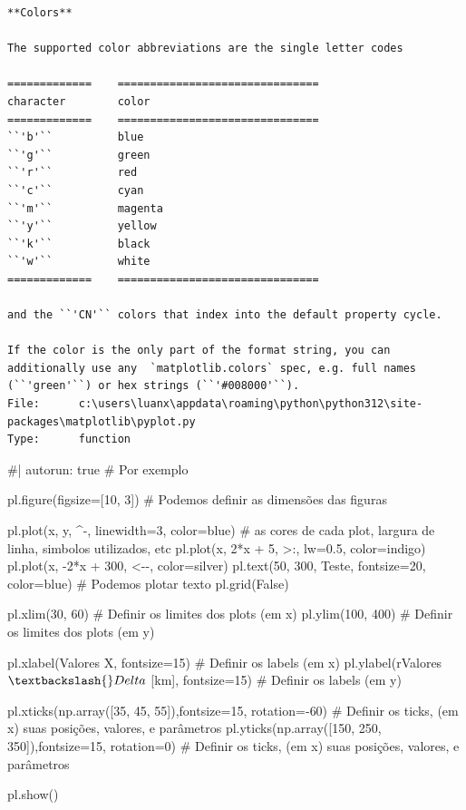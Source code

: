 \documentclass[
  letterpaper,
  DIV=11,
  numbers=noendperiod]{scrreprt}
\newenvironment{Shaded}{\begin{snugshade}}{\end{snugshade}}
\newcommand{\NormalTok}[1]{\textcolor[rgb]{0.00,0.23,0.31}{#1}}
\begin{document}
\begin{verbatim}
**Colors**

The supported color abbreviations are the single letter codes

=============    ===============================
character        color
=============    ===============================
``'b'``          blue
``'g'``          green
``'r'``          red
``'c'``          cyan
``'m'``          magenta
``'y'``          yellow
``'k'``          black
``'w'``          white
=============    ===============================

and the ``'CN'`` colors that index into the default property cycle.

If the color is the only part of the format string, you can
additionally use any  `matplotlib.colors` spec, e.g. full names
(``'green'``) or hex strings (``'#008000'``).
File:      c:\users\luanx\appdata\roaming\python\python312\site-packages\matplotlib\pyplot.py
Type:      function
\end{verbatim}

\begin{Shaded}
\begin{Highlighting}[]
\NormalTok{\#| autorun: true}
\NormalTok{\# Por exemplo}

\NormalTok{pl.figure(figsize=[10, 3]) \# Podemos definir as dimensões das figuras}

\NormalTok{pl.plot(x, y, \textquotesingle{}\^{}{-}\textquotesingle{}, linewidth=3, color=\textquotesingle{}blue\textquotesingle{}) \# as cores de cada plot, largura de linha, simbolos utilizados, etc}
\NormalTok{pl.plot(x, 2*x + 5, \textquotesingle{}\textgreater{}:\textquotesingle{}, lw=0.5, color=\textquotesingle{}indigo\textquotesingle{})}
\NormalTok{pl.plot(x, {-}2*x + 300, \textquotesingle{}\textless{}{-}{-}\textquotesingle{}, color=\textquotesingle{}silver\textquotesingle{})}
\NormalTok{pl.text(50, 300, \textquotesingle{}Teste\textquotesingle{}, fontsize=20, color=\textquotesingle{}blue\textquotesingle{}) \# Podemos plotar texto}
\NormalTok{pl.grid(False)}

\NormalTok{pl.xlim(30, 60) \# Definir os limites dos plots (em x)}
\NormalTok{pl.ylim(100, 400) \# Definir os limites dos plots (em y)}

\NormalTok{pl.xlabel(\textquotesingle{}Valores X\textquotesingle{}, fontsize=15) \# Definir os labels (em x)}
\NormalTok{pl.ylabel(r\textquotesingle{}Valores $\textbackslash{}Delta$ [km]\textquotesingle{}, fontsize=15) \# Definir os labels (em y)}

\NormalTok{pl.xticks(np.array([35, 45, 55]),fontsize=15, rotation={-}60) \# Definir os ticks, (em x) suas posições, valores, e parâmetros}
\NormalTok{pl.yticks(np.array([150, 250, 350]),fontsize=15, rotation=0) \# Definir os ticks, (em x) suas posições, valores, e parâmetros}

\NormalTok{pl.show()}
\end{Highlighting}
\end{Shaded}
\end{document}
